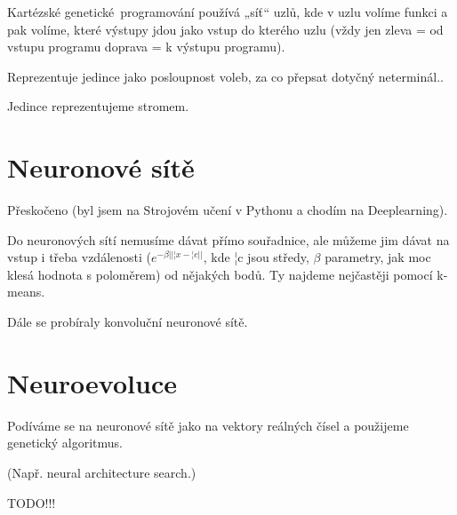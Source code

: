 \documentclass[12pt]{article}					%
\begin{document}
\begin{definice}
	Kartézské genetické programování používá „síť“ uzlů, kde v uzlu volíme funkci a pak volíme, které výstupy jdou jako vstup do kterého uzlu (vždy jen zleva = od vstupu programu doprava = k výstupu programu).
\end{definice}

\begin{definice}
	Reprezentuje jedince jako posloupnost voleb, za co přepsat dotyčný neterminál..
\end{definice}

\begin{definice}
	Jedince reprezentujeme stromem.
\end{definice}


\section{Neuronové sítě}
Přeskočeno (byl jsem na Strojovém učení v Pythonu a chodím na Deeplearning).



\begin{definice}
	Do neuronových sítí nemusíme dávat přímo souřadnice, ale můžeme jim dávat na vstup i třeba vzdálenosti ($e^{-\beta ||¦x - ¦c||}$, kde ¦c jsou středy, $\beta$ parametry, jak moc klesá hodnota s poloměrem) od nějakých bodů. Ty najdeme nejčastěji pomocí k-means.
\end{definice}

Dále se probíraly konvoluční neuronové sítě.


\section{Neuroevoluce}
\begin{definice}
	Podíváme se na neuronové sítě jako na vektory reálných čísel a použijeme genetický algoritmus.
\end{definice}

\begin{definice}
	(Např. neural architecture search.)
\end{definice}

TODO!!!
\end{document}
